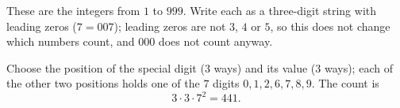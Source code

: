 These are the integers from $1$ to $999$. Write each as a three-digit string with leading zeros ($7=007$); leading zeros are not $3$, $4$ or $5$, so this does not change which numbers count, and $000$ does not count anyway.

Choose the position of the special digit ($3$ ways) and its value ($3$ ways); each of the other two positions holds one of the $7$ digits $0,1,2,6,7,8,9$. The count is
\[
3\cdot3\cdot7^2=\boxed{441}.
\]
